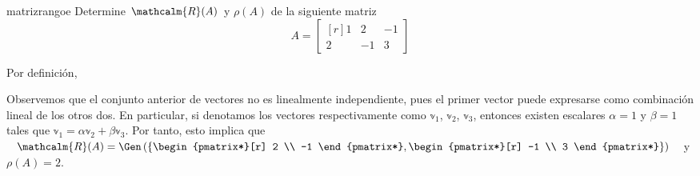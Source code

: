 \begin{examplebox}{}{matrizrangoe}
    Determine $\mathcalm{R}(A)$ y $\rho(A)$ de la siguiente matriz
    $$A = \begin{bmatrix*}[r]
        1 & 2 & -1 \\
        2 & -1 & 3
    \end{bmatrix*}$$

    \tcblower
    \solucion Por definición,
    \begin{matrizn}
    \end{matrizn}
    Observemos que el conjunto anterior de vectores no es linealmente independiente, pues el primer vector puede expresarse como combinación lineal de los otros dos. En particular, si denotamos los vectores respectivamente como $\mathbb{v}_1$, $\mathbb{v}_2$, $\mathbb{v}_3$, entonces existen escalares $\alpha = 1$ y $\beta = 1$ tales que $\mathbb{v}_1 = \alpha \mathbb{v}_2 + \beta \mathbb{v}_3$. Por tanto, esto implica que $\mathcalm{R}(A) = \Gen \left(\left\{ \begin{pmatrix*}[r]
        2 \\
        -1
    \end{pmatrix*}, \begin{pmatrix*}[r]
        -1 \\
        3
    \end{pmatrix*} \right\}\right)$ y $\rho(A) = 2$.
\end{examplebox}

\newpage

